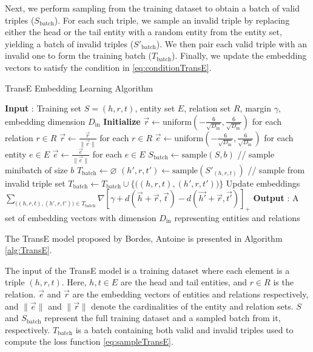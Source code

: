 Next, we perform sampling from the training dataset to obtain a batch of valid triples ($S_{\text{batch}}$). For each such triple, we sample an invalid triple by replacing either the head or the tail entity with a random entity from the entity set, yielding a batch of invalid triples ($S'_{\text{batch}}$). We then pair each valid triple with an invalid one to form the training batch ($T_{\text{batch}}$). Finally, we update the embedding vectors to satisfy the condition in \ref{eq:conditionTransE}.

\begin{algorithm}[h]
	\caption{TransE Embedding Learning Algorithm \protect\cite{bordes2013translating}}\label{alg:TransE}
	\begin{algorithmic}[1]
		\Statex \textbf{Input} :
		Training set $S = {(h, r, t)}$, entity set $E$, relation set $R$, margin $\gamma$, embedding dimension $D_{\text{in}}$	
		\Statex \textbf{Initialize}
		\State $\overrightarrow{r} \leftarrow \text{uniform}(-\frac{6}{\sqrt{D_{\text{in}}}}, \frac{6}{\sqrt{D_{\text{in}}}})$ for each relation $r \in R$
		\State $\overrightarrow{r} \leftarrow \frac{\overrightarrow{r}}{\|\overrightarrow{r}\|}$ for each $r \in R$
		\State $\overrightarrow{e} \leftarrow \text{uniform}(-\frac{6}{\sqrt{D_{\text{in}}}}, \frac{6}{\sqrt{D_{\text{in}}}})$ for each entity $e \in E$
		\Loop
		\State $\overrightarrow{e} \leftarrow \frac{\overrightarrow{e}}{\|\overrightarrow{e}\|}$ for each $e \in E$
		\State $S_{\text{batch}} \leftarrow \text{sample}(S, b)$  // sample minibatch of size $b$
		\State $T_{\text{batch}} \leftarrow \varnothing $
		\State $(h', r, t') \leftarrow \text{sample}(S'_{(h, r, t)})$ // sample from invalid triple set
		\State $T_{\text{batch}} \leftarrow T_{\text{batch}} \cup \Big\{ \Big( (h, r, t), (h', r, t') \Big) \Big\}$
		\EndFor
		\Statex Update embeddings
		\State $\sum_{\Big( (h, r, t), (h', r, t')\Big) \in T_{\text{batch}}} \nabla [\gamma + d(\overrightarrow{h} + \overrightarrow{r}, \overrightarrow{t}) - d(\overrightarrow{h'} + \overrightarrow{r}, \overrightarrow{t'})]_{+}$
		\EndLoop
		\Statex \textbf{Output} :
		A set of embedding vectors with dimension $D_{\text{in}}$ representing entities and relations
	\end{algorithmic}
\end{algorithm}

The TransE model proposed by Bordes, Antoine \cite{bordes2013translating} is presented in Algorithm \ref{alg:TransE}.


The input of the TransE model is a training dataset where each element is a triple $(h, r, t)$. Here, $h, t \in E$ are the head and tail entities, and $r \in R$ is the relation. $\overrightarrow{e}$ and $\overrightarrow{r}$ are the embedding vectors of entities and relations respectively, and $\|\overrightarrow{e}\|$ and $\|\overrightarrow{r}\|$ denote the cardinalities of the entity and relation sets. $S$ and $S_{\text{batch}}$ represent the full training dataset and a sampled batch from it, respectively. $T_{\text{batch}}$ is a batch containing both valid and invalid triples used to compute the loss function \ref{eq:sampleTransE}.

